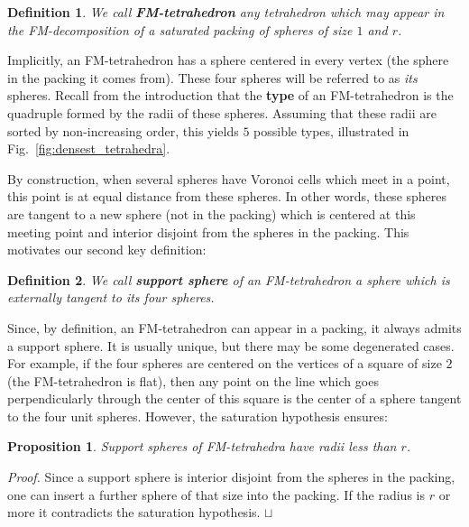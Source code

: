 \documentclass[11pt]{article}
\newtheorem{proposition}{Proposition}
\newtheorem{definition}{Definition}
\newenvironment{proof}{\noindent \emph{Proof. }}{\hfill \hbox{\rlap{$\sqcap$}$\sqcup$}\\}
\begin{document}
\begin{definition}
\label{def:fm_tetra}
We call {\bf FM-tetrahedron} any tetrahedron which may appear in the FM-decomposition of a saturated packing of spheres of size $1$ and $r$.
\end{definition}

Implicitly, an FM-tetrahedron has a sphere centered in every vertex (the sphere in the packing it comes from).
These four spheres will be referred to as {\em its} spheres.
Recall from the introduction that the {\bf type} of an FM-tetrahedron is the quadruple formed by the radii of these spheres.
Assuming that these radii are sorted by non-increasing order, this yields $5$ possible types, illustrated in Fig.~\ref{fig:densest_tetrahedra}.

By construction, when several spheres have Voronoi cells which meet in a point, this point is at equal distance from these spheres.
In other words, these spheres are tangent to a new sphere (not in the packing) which is centered at this meeting point and interior disjoint from the spheres in the packing.
This motivates our second key definition:

\begin{definition}
\label{def:support_sphere}
We call {\bf support sphere} of an FM-tetrahedron a sphere which is externally tangent to its four spheres.
\end{definition}

Since, by definition, an FM-tetrahedron can appear in a packing, it always admits a support sphere.
It is usually unique, but there may be some degenerated cases.
For example, if the four spheres are centered on the vertices of a square of size $2$ (the FM-tetrahedron is flat), then any point on the line which goes perpendicularly through the center of this square is the center of a sphere tangent to the four unit spheres.
However, the saturation hypothesis ensures:

\begin{proposition}
\label{prop:bounded_radius}
Support spheres of FM-tetrahedra have radii less than $r$.
\end{proposition}

\begin{proof}
Since a support sphere is interior disjoint from the spheres in the packing, one can insert a further sphere of that size into the packing.
If the radius is $r$ or more it contradicts the saturation hypothesis.
\end{proof}
\end{document}
